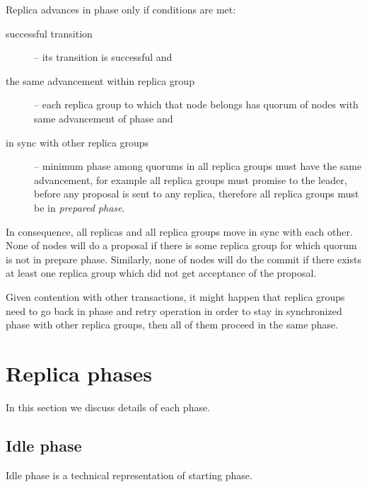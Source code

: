 

Replica advances in phase only if conditions are met: \begin{description}
\item[successful transition] -- its transition is successful and
\item[the same advancement within replica group] -- each replica group to which that node belongs has quorum of nodes
with same advancement of phase and
\item[in sync with other replica groups] -- minimum phase among quorums in all replica groups must have the same
advancement, for example all replica groups must promise to the leader, before any proposal is sent to any replica, therefore all replica groups must be in \emph{prepared phase}.
\end{description}


In consequence, all replicas and all replica groups move in sync with each other. None of nodes will do a proposal if there is some replica group for which quorum is not in prepare phase. 
Similarly, none of nodes will do the commit if there exists at least one replica group which did not get acceptance of the proposal.  

Given contention with other transactions, it might happen that replica groups need to go back in phase and retry
operation in order to stay in synchronized phase with other replica groups, then all of them proceed in the same phase.

\section{Replica phases}
In this section we discuss details of each phase.

\subsection{Idle phase}
Idle phase is a technical representation of starting phase.

